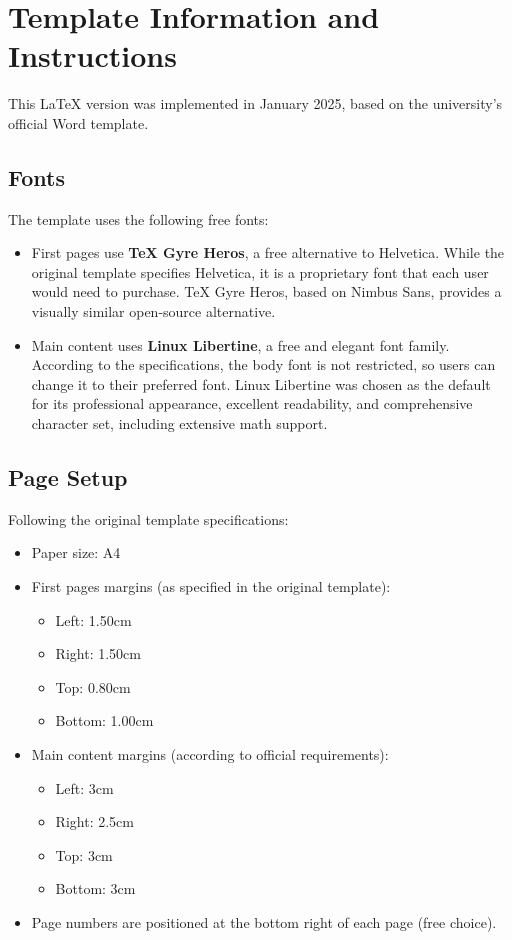 \clearpage
\section{Template Information and Instructions}
This LaTeX version was implemented in January 2025, based on the university's official Word template.

\subsection{Fonts}
The template uses the following free fonts:
\begin{itemize}
    \item First pages use \textbf{TeX Gyre Heros}, a free alternative to Helvetica. While the original template specifies Helvetica, it is a proprietary font that each user would need to purchase. TeX Gyre Heros, based on Nimbus Sans, provides a visually similar open-source alternative.
    \item Main content uses \textbf{Linux Libertine}, a free and elegant font family. According to the specifications, the body font is not restricted, so users can change it to their preferred font. Linux Libertine was chosen as the default for its professional appearance, excellent readability, and comprehensive character set, including extensive math support.
\end{itemize}

\subsection{Page Setup}
Following the original template specifications:
\begin{itemize}
    \item Paper size: A4
    \item First pages margins (as specified in the original template):
    \begin{itemize}
        \item Left: 1.50cm
        \item Right: 1.50cm
        \item Top: 0.80cm
        \item Bottom: 1.00cm
    \end{itemize}
    \item Main content margins (according to official requirements):
    \begin{itemize}
        \item Left: 3cm
        \item Right: 2.5cm
        \item Top: 3cm
        \item Bottom: 3cm
    \end{itemize}
    \item Page numbers are positioned at the bottom right of each page (free choice).
\end{itemize}

